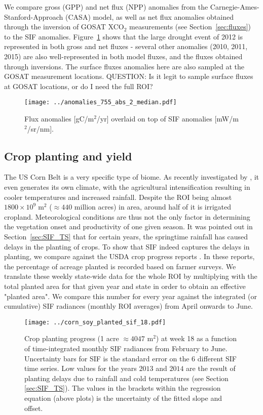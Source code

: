 \documentclass[preprint, a4paper, 10pt, times]{elsarticle}
\begin{document}
We compare gross (GPP) and net flux (NPP) 
anomalies from the Carnegie-Ames-Stanford-Approach (CASA) model, as well as net flux anomalies obtained through the inversion of GOSAT XCO$_2$ measurements (see Section~\ref{sec:fluxes}) to the SIF anomalies. Figure~\ref{fig:anomalies_3} shows that the large drought event of 2012 is represented in both gross and net fluxes - several other anomalies (2010, 2011, 2015) are also well-represented in both model fluxes, and the fluxes obtained through inversions. The surface fluxes anomalies here are also sampled at the GOSAT measurement locations. QUESTION: Is it legit to sample surface fluxes at GOSAT locations, or do I need the full ROI?

\begin{figure}[htbp]
\centering
\texttt{[image: ../anomalies\_755\_abs\_2\_median.pdf]}
\caption{Flux anomalies [gC/m$^2$/yr] overlaid on top of SIF anomalies [mW/m$^2$/sr/nm].}
\label{fig:anomalies_3}
\end{figure}

\subsection{Crop planting and yield}

The US Corn Belt is a very specific type of biome. As recently investigated by \citet{Alter2017}, it even generates its own climate, with the agricultural intensification resulting in cooler temperatures and increased rainfall. Despite the ROI being almost $1800 \times 10^9\;\mathrm{m}^2$ ($\approx 440$ million acres) in area, around half of it is irrigated cropland. Meteorological conditions are thus not the only factor in determining the vegetation onset and productivity of one given season. It was pointed out in Section~\ref{sec:SIF_TS} that for certain years, the springtime rainfall has caused delays in the planting of crops. To show that SIF indeed captures the delays in planting, we compare against the USDA crop progress reports \citep{USDA2010,USDA2011,USDA2012,USDA2013,USDA2014,USDA2015,USDA2016}. In these reports, the percentage of acreage planted is recorded based on farmer surveys. We translate these weekly state-wide data for the whole ROI by multiplying with the total planted area for that given year and state in order to obtain an effective "planted area". We compare this number for every year against the integrated (or cumulative) SIF radiances (monthly ROI averages) from April onwards to June.

\begin{figure}[htbp]
\centering
\texttt{[image: ../corn\_soy\_planted\_sif\_18.pdf]}
\caption{Crop planting progress (1 acre $\approx 4047$ m$^2$) at week 18 as a function of time-integrated monthly SIF radiances from February to June. Uncertainty bars for SIF is the standard error on the 6 different SIF time series. Low values for the years $2013$ and $2014$ are the result of planting delays due to rainfall and cold temperatures (see Section \ref{sec:SIF_TS}). The values in the brackets within the regression equation (above plots) is the uncertainty of the fitted slope and offset.}
\label{fig:corn_soy_planted_sif}
\end{figure}
\end{document}
